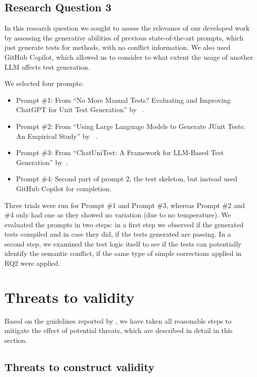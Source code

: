 \subsection{Research Question 3}

In this research question we sought to assess the relevance of our developed work by assessing the generative abilities of previous state-of-the-art prompts, which just generate tests for methods, with no conflict information.
We also used GitHub Copilot, which allowed us to consider to what extent the usage of another LLM affects test generation.

We selected four prompts:
\begin{itemize}
  \item Prompt \#1: From ``No More Manual Tests? Evaluating and Improving ChatGPT for Unit Test Generation'' by ~\citet{kn:chattester}.
  \item Prompt \#2: From ``Using Large Language Models to Generate JUnit Tests: An Empirical Study'' by ~\citet{kn:siddiq2023empirical}.
  \item Prompt \#3: From ``ChatUniTest: A Framework for LLM-Based Test Generation'' by~\citet{kn:chatunitest}.
  \item Prompt \#4: Second part of prompt 2, the test skeleton, but instead used GitHub Copilot for completion.
\end{itemize}
%
Three trials were run for Prompt \#1 and Prompt \#3, whereas Prompt \#2 and \#4 only had one as they showed no variation (due to no temperature).
We evaluated the prompts in two steps: in a first step we observed if the generated tests compiled and in case they did, if the tests generated are passing.
In a second step, we examined the test logic itself to see if the tests can potentially identify the semantic conflict, if the same type of simple corrections applied in RQ2 were applied.

\section{Threats to validity}

Based on the guidelines reported by \citet{wohlin2012experimentation}, we have
taken all reasonable steps to mitigate the effect of potential threats, which
are described in detail in this section.

\subsection{Threats to construct validity}

